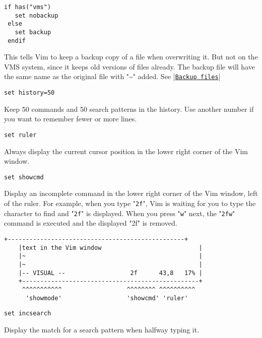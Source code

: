  \begin{Verbatim}[samepage=true]
 if has("vms")
   set nobackup
 else
   set backup
 endif
 \end{Verbatim}

This tells Vim to keep a backup copy of a file when overwriting it.
But not on the VMS system, since it keeps old versions of files already.
The backup file will have the same name as the original file with "\textasciitilde" added.
See |\hyperref[Backup files]{\texttt{Backup files}}|

 \begin{Verbatim}[samepage=true]
 set history=50
 \end{Verbatim}

Keep 50 commands and 50 search patterns in the history.
Use another number if you want to remember fewer or more lines.

 \begin{Verbatim}[samepage=true]
 set ruler
 \end{Verbatim}

Always display the current cursor position in the lower right corner of the Vim window.

 \begin{Verbatim}[samepage=true]
 set showcmd
 \end{Verbatim}

Display an incomplete command in the lower right corner of the Vim window, left of the ruler.
For example, when you type "\texttt{2f}", Vim is waiting for you to type the character to find and "\texttt{2f}" is displayed.
When you press "\texttt{w}" next, the "\texttt{2fw}" command is executed and the displayed "2f" is removed.

\begin{Verbatim}[samepage=true]
    +-------------------------------------------------+
    |text in the Vim window                           |
    |~                                                |
    |~                                                |
    |-- VISUAL --                  2f      43,8   17% |
    +-------------------------------------------------+
     ^^^^^^^^^^^                  ^^^^^^^^ ^^^^^^^^^^
      'showmode'                  'showcmd' 'ruler'
\end{Verbatim}

\begin{Verbatim}[samepage=true]
 set incsearch
\end{Verbatim}

Display the match for a search pattern when halfway typing it.

